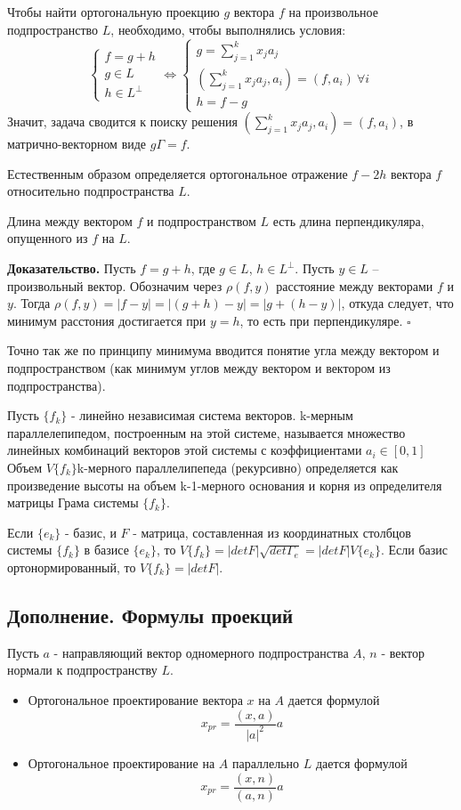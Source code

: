 Чтобы найти ортогональную проекцию $g$ вектора $f$ на произвольное 
подпространство $L$, необходимо, чтобы выполнялись условия:
$$\begin{cases}
f=g+h\\g\in L\\h\in L^\perp
\end{cases}\Leftrightarrow\begin{cases}
g=\sum\limits^k_{j=1}x_ja_j\\(\sum\limits^k_{j=1}x_ja_j, a_i)=(f,a_i)~\forall
i\\h=f-g
\end{cases}$$
Значит, задача сводится к поиску решения $(\sum\limits^k_{j=1}x_ja_j, a_i)=
(f,a_i)$, в матрично-векторном виде $g\Gamma=f$.

Естественным образом определяется ортогональное отражение $f-2h$ вектора $f$
относительно подпространства $L$.
\begin{theor}
Длина между вектором $f$ и подпространством $L$ есть длина перпендикуляра,
опущенного из $f$ на $L$.
\end{theor}
\textbf{Доказательство.} Пусть $f=g+h$, где
$g\in L$, $h\in L^\perp$. Пусть $y\in L$ – произвольный
вектор. Обозначим через $\rho( f , y)$ расстояние
между векторами $f$ и $y$. Тогда $\rho(f,y)=|f-y|=|(g+h)-y|=|g+(h-y)|$, откуда
следует, что минимум расстония достигается при $y=h$, то есть при перпендикуляре. $\square$

Точно так же по принципу минимума вводится понятие угла между вектором и
подпространством (как минимум углов между вектором и вектором из
подпространства).
\begin{defin}
Пусть $\{f_k\}$ - линейно независимая система векторов. k-мерным 
параллелепипедом, построенным на этой системе, называется множество линейных
комбинаций векторов этой системы с коэффициентами $a_i\in[0,1]$\\
Объем $V\{f_k\} $k-мерного параллелипепеда (рекурсивно) определяется как
произведение высоты на объем k-1-мерного основания и корня из определителя 
матрицы Грама системы $\{f_k\}$.
\end{defin}
Если $\{e_k\}$ - базис, и $F$ - матрица, составленная из координатных столбцов
системы $\{f_k\}$ в базисе $\{e_k\}$, то $V\{f_k\}=|detF|\sqrt{det\Gamma_e}=
|detF|V\{e_k\}$. Если базис ортонормированный, то $V\{f_k\}=|detF|$.


\subsection{Дополнение. Формулы проекций}
Пусть $a$ - направляющий вектор одномерного подпространства $A$, $n$ - вектор 
нормали к подпространству $L$.
\begin{itemize}
\item Ортогональное проектирование вектора $x$ на $A$ дается формулой
$$x_{pr}=\frac{(x,a)}{|a|^2}a$$
\item Ортогональное проектирование на $A$ параллельно $L$ дается формулой
$$x_{pr}=\frac{(x,n)}{(a,n)}a$$

\end{itemize}





